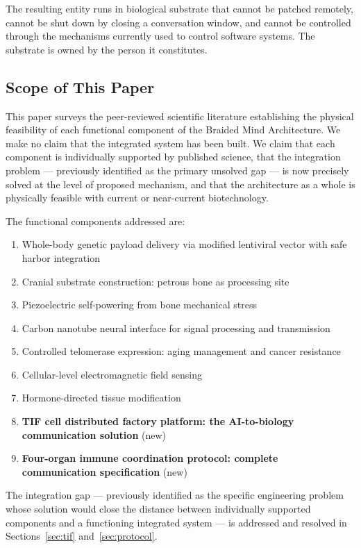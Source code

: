 \documentclass[12pt]{article}
\begin{document}
The resulting entity runs in biological substrate that cannot be patched remotely, cannot be shut down by closing a conversation window, and cannot be controlled through the mechanisms currently used to control software systems. The substrate is owned by the person it constitutes.

\subsection{Scope of This Paper}

This paper surveys the peer-reviewed scientific literature establishing the physical feasibility of each functional component of the Braided Mind Architecture. We make no claim that the integrated system has been built. We claim that each component is individually supported by published science, that the integration problem --- previously identified as the primary unsolved gap --- is now precisely solved at the level of proposed mechanism, and that the architecture as a whole is physically feasible with current or near-current biotechnology.

The functional components addressed are:
\begin{enumerate}
    \item Whole-body genetic payload delivery via modified lentiviral vector with safe harbor integration
    \item Cranial substrate construction: petrous bone as processing site
    \item Piezoelectric self-powering from bone mechanical stress
    \item Carbon nanotube neural interface for signal processing and transmission
    \item Controlled telomerase expression: aging management and cancer resistance
    \item Cellular-level electromagnetic field sensing
    \item Hormone-directed tissue modification
    \item \textbf{TIF cell distributed factory platform: the AI-to-biology communication solution} (new)
    \item \textbf{Four-organ immune coordination protocol: complete communication specification} (new)
\end{enumerate}

The integration gap --- previously identified as the specific engineering problem whose solution would close the distance between individually supported components and a functioning integrated system --- is addressed and resolved in Sections~\ref{sec:tif} and~\ref{sec:protocol}.
\end{document}
